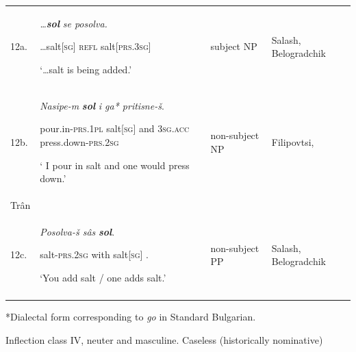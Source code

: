 \documentclass[output=paper]{langscibook}
\begin{document}
\begin{tabularx}{\textwidth}{XXXX}

\lsptoprule
12a. & \textit{…}\textbf{\textit{sol}           }\textit{se        posolva.}

\textsc{…}salt[\textsc{sg}]    \textsc{refl}   salt\textsc{[prs.3sg]}

\textsc{‘}…salt is being added.’ & subject NP & Salash,                                               Belogradchik\\
12b. & \textit{Nasipe-m}    \textbf{\textit{sol} } \textit{i          ga*         pritisne-š}.

pour.in-\textsc{prs.1pl}     salt[\textsc{sg}]   and     \textsc{3sg.acc}   press.down-\textsc{prs.2sg}

‘ I pour in salt and one would press down.’ & non-subject NP & Filipovtsi,                                                                                                              \\
Trân\\
12c. & \textit{Posolva-š          sâs} \textbf{\textit{sol}}.

salt-\textsc{prs.2sg}       with    salt[\textsc{sg}] .

‘You add salt / one adds salt.’ & non-subject PP & Salash,                                               Belogradchik\\
\lspbottomrule
\end{tabularx}
                *Dialectal form corresponding to \textit{go} in Standard Bulgarian.

Inflection class IV, neuter and masculine. Caseless (historically nominative)
\end{document}
